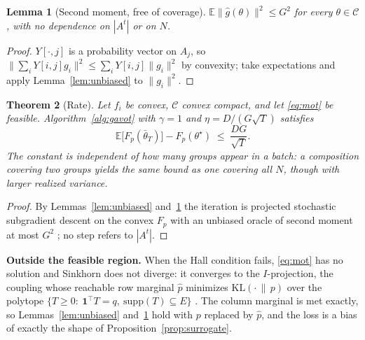 \documentclass{article}
\newtheorem{theorem}{Theorem}
\newtheorem{lemma}[theorem]{Lemma}
\theoremstyle{definition}
\newcommand{\E}{\mathbb{E}}
\newcommand{\KL}{\mathrm{KL}}
\begin{document}
\begin{lemma}[Second moment, free of coverage]
\label{lem:variance}
$\E\|\hat g(\theta)\|^2\le G^2$ for every $\theta\in\mathcal{C}$, with no
dependence on $|A^t|$ or on $N$.
\end{lemma}
\begin{proof}
$Y[\cdot,j]$ is a probability vector on $A_j$, so
$\|\sum_i Y[i,j]g_i\|^2\le\sum_i Y[i,j]\|g_i\|^2$ by convexity; take
expectations and apply Lemma~\ref{lem:unbiased} to $\|g_i\|^2$.
\end{proof}

\begin{theorem}[Rate]
\label{thm:rate}
Let $f_i$ be convex, $\mathcal{C}$ convex compact, and let \eqref{eq:mot} be
feasible. Algorithm~\ref{alg:gavot} with $\gamma=1$ and
$\eta=D/(G\sqrt{T})$ satisfies
\begin{equation}
\E\big[F_p(\bar\theta_T)\big]-F_p(\theta^\star)\;\le\;\frac{DG}{\sqrt{T}} .
\end{equation}
The constant is independent of how many groups appear in a batch: a composition
covering two groups yields the same bound as one covering all $N$, though with
larger realized variance.
\end{theorem}
\begin{proof}
By Lemmas~\ref{lem:unbiased} and~\ref{lem:variance} the iteration is projected
stochastic subgradient descent on the convex $F_p$ with an unbiased oracle of
second moment at most $G^2$ \cite{nemirovski2009}; no step refers to $|A^t|$.
\end{proof}

\noindent\textbf{Outside the feasible region.}
When the Hall condition fails, \eqref{eq:mot} has no solution and Sinkhorn does
not diverge: it converges to the $I$-projection, the coupling whose reachable
row marginal $\hat p$ minimizes $\KL(\cdot\,\|\,p)$ over the polytope
$\{T\ge 0:\ \mathbf{1}^\top T=q,\ \mathrm{supp}(T)\subseteq E\}$
\cite{csiszar1975,peyre2019}. The column marginal is met exactly, so
Lemmas~\ref{lem:unbiased} and~\ref{lem:variance} hold with $p$ replaced by
$\hat p$, and the loss is a bias of exactly the shape of
Proposition~\ref{prop:surrogate}.
\end{document}
